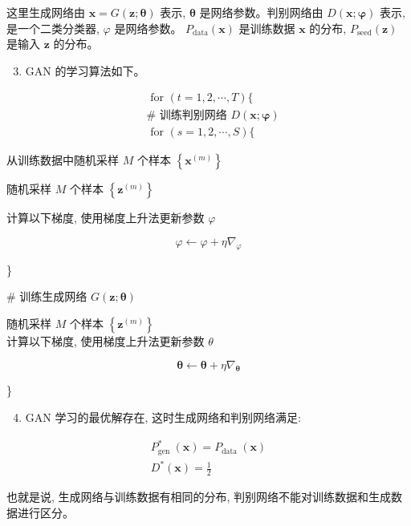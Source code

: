 \documentclass[10pt]{article}
\begin{document}
这里生成网络由 $\boldsymbol{x}=G(\boldsymbol{z} ; \boldsymbol{\theta})$ 表示, $\boldsymbol{\theta}$ 是网络参数。判别网络由 $D(\boldsymbol{x} ; \boldsymbol{\varphi})$ 表示, 是一个二类分类器, $\varphi$ 是网络参数。 $P_{\mathrm{data}}(\boldsymbol{x})$ 是训练数据 $\boldsymbol{x}$ 的分布, $P_{\mathrm{seed}}(\boldsymbol{z})$ 是输入 $\boldsymbol{z}$ 的分布。

\begin{enumerate}
  \setcounter{enumi}{2}
  \item GAN 的学习算法如下。
\end{enumerate}

$$
\begin{aligned}
& \text { for }(t=1,2, \cdots, T)\{ \\
& \# \text { 训练判别网络 } D(\boldsymbol{x} ; \boldsymbol{\varphi}) \\
& \text { for }(s=1,2, \cdots, S)\{
\end{aligned}
$$

从训练数据中随机采样 $M$ 个样本 $\left\{\boldsymbol{x}^{(m)}\right\}$

随机采样 $M$ 个样本 $\left\{\boldsymbol{z}^{(m)}\right\}$

计算以下梯度, 使用梯度上升法更新参数 $\varphi$

$$
\varphi \leftarrow \varphi+\eta \nabla_{\varphi}
$$

\}

\# 训练生成网络 $G(\boldsymbol{z} ; \boldsymbol{\theta})$

随机采样 $M$ 个样本 $\left\{\boldsymbol{z}^{(m)}\right\}$\\
计算以下梯度, 使用梯度上升法更新参数 $\theta$

$$
\boldsymbol{\theta} \leftarrow \boldsymbol{\theta}+\eta \nabla_{\boldsymbol{\theta}}
$$

\}

\begin{enumerate}
  \setcounter{enumi}{3}
  \item GAN 学习的最优解存在, 这时生成网络和判别网络满足:
\end{enumerate}

$$
\begin{gathered}
P_{\text {gen }}^{*}(\boldsymbol{x})=P_{\text {data }}(\boldsymbol{x}) \\
D^{*}(\boldsymbol{x})=\frac{1}{2}
\end{gathered}
$$

也就是说, 生成网络与训练数据有相同的分布, 判别网络不能对训练数据和生成数据进行区分。
\end{document}
